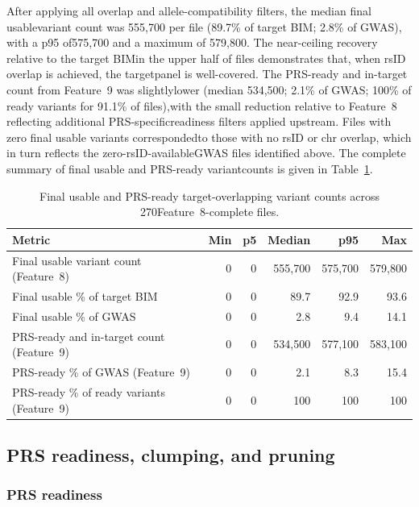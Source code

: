 \documentclass[11pt,a4paper]{article}
\begin{document}
After applying all overlap and allele-compatibility filters, the median final usablevariant count was 555,700 per file (89.7\% of target BIM; 2.8\% of GWAS), with a p95 of575,700 and a maximum of 579,800. The near-ceiling recovery relative to the target BIMin the upper half of files demonstrates that, when rsID overlap is achieved, the targetpanel is well-covered. The PRS-ready and in-target count from Feature~9 was slightlylower (median 534,500; 2.1\% of GWAS; 100\% of ready variants for 91.1\% of files),with the small reduction relative to Feature~8 reflecting additional PRS-specificreadiness filters applied upstream. Files with zero final usable variants correspondedto those with no rsID or chr overlap, which in turn reflects the zero-rsID-availableGWAS files identified above. The complete summary of final usable and PRS-ready variantcounts is given in Table~\ref{tab}.

\begin{table}[h]
\centering
\caption{Final usable and PRS-ready target-overlapping variant counts across 270Feature~8-complete files.}
\label{tab}
\begin{tabular}{lrrrrr}
\toprule
Metric & Min & p5 & Median & p95 & Max \\
\midrule
Final usable variant count (Feature~8)            & 0 & 0 & 555,700 & 575,700 & 579,800 \\
Final usable \% of target BIM                     & 0 & 0 & 89.7    & 92.9    & 93.6 \\
Final usable \% of GWAS                           & 0 & 0 & 2.8     & 9.4     & 14.1    \\
PRS-ready and in-target count (Feature~9)         & 0 & 0 & 534,500 & 577,100 & 583,100 \\
PRS-ready \% of GWAS (Feature~9)                  & 0 & 0 & 2.1     & 8.3     & 15.4    \\
PRS-ready \% of ready variants (Feature~9)        & 0 & 0 & 100     & 100     & 100     \\
\bottomrule
\end{tabular}
\end{table}

\subsection{PRS readiness, clumping, and pruning}

\subsubsection*{PRS readiness}
\end{document}
